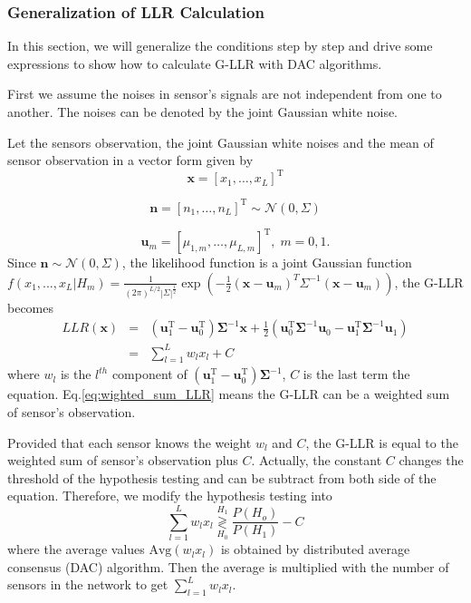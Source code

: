 \subsubsection*{Generalization of LLR Calculation }

In this section, we will generalize the conditions step by step and
drive some expressions to show how to calculate G-LLR with DAC algorithms. 

First we assume the noises in sensor's signals are not independent
from one to another. The noises can be denoted by the joint Gaussian
white noise. 

Let the sensors observation, the joint Gaussian white noises and the
mean of sensor observation in a vector form given by 
\[
\mathbf{x}=\left[x_{1},\ldots,x_{L}\right]^{\mathrm{T}}
\]


\[
\mathbf{n}=\left[n_{1},\ldots,n_{L}\right]^{\mathrm{T}}\sim\mathcal{N}\left(0,\Sigma\right)
\]


\begin{equation}
\mathbf{u}_{m}=\left[\mu_{1,m},\ldots,\mu_{L,m}\right]^{\mathrm{T}},\; m=0,1.
\end{equation}
Since $\mathbf{n}\sim\mathcal{N}\left(0,\Sigma\right)$, the likelihood
function is a joint Gaussian function $f\left(x_{1},...,x_{L}|H_{m}\right)=\frac{1}{\left(2\pi\right)^{L/2}\left|\Sigma\right|^{\frac{1}{2}}}\exp\left(-\frac{1}{2}\left(\mathbf{x}-\mathbf{u}_{m}\right)^{T}\Sigma^{-1}\left(\mathbf{x}-\mathbf{u}_{m}\right)\right)$,
the G-LLR becomes 
\begin{eqnarray}
LLR(\mathbf{x}) & = & \left(\mathbf{u}_{1}^{\mathrm{T}}-\mathbf{u}_{0}^{\mathrm{T}}\right)\mathbf{\Sigma}^{-1}\mathbf{x}+\frac{1}{2}\left(\mathbf{u}_{0}^{\mathrm{T}}\mathbf{\Sigma}^{-1}\mathbf{u}_{0}-\mathbf{u}_{1}^{\mathrm{T}}\mathbf{\Sigma}^{-1}\mathbf{u}_{1}\right)\label{eq:wighted_sum_LLR}\\
 & = & \sum_{l=1}^{L}w_{l}x_{l}+C\nonumber 
\end{eqnarray}
where $w_{l}$ is the $l^{th}$ component of $\left(\mathbf{u}_{1}^{\mathrm{T}}-\mathbf{u}_{0}^{\mathrm{T}}\right)\mathbf{\Sigma}^{-1}$,
$C$ is the last term the equation. Eq.\ref{eq:wighted_sum_LLR} means
 the G-LLR can be a weighted sum of sensor's observation. 

Provided that each sensor knows the weight $w_{l}$ and $C$, the
G-LLR is equal to the weighted sum of sensor's observation plus $C$.
Actually, the constant $C$ changes the threshold of the hypothesis
testing and can be subtract from both side of the equation. Therefore,
we modify the hypothesis testing into 
\[
\sum_{l=1}^{L}w_{l}x_{l}\underset{H_{0}}{\overset{H_{1}}{\gtrless}}\frac{P\left(H_{o}\right)}{P\left(H_{1}\right)}-C
\]
where the average values $\mbox{Avg}\left(w_{l}x_{l}\right)$ is obtained
by distributed average consensus (DAC) algorithm. Then the average
is multiplied with the number of sensors in the network to get $\sum_{l=1}^{L}w_{l}x_{l}$.


